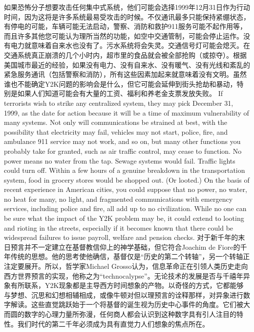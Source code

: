 \begin{paracol}{2}
\switchcolumn*
如果恐怖分子想要攻击任何集中式系统，他们可能会选择1999年12月31日作为行动时间，因为这将是许多系统最易受攻击的时候。不仅通讯最多只能保持紧绷状态，有停电的可能，车辆可能无法启动，警察、消防和救护911服务可能不起作用等，而且许多其他您可能认为理所当然的功能，如空中交通管制，可能会停止运作。没有电力就意味着自来水也没有了。污水系统将会失灵。交通信号灯可能会熄灭。在交通系统真正崩溃的几个小时内，超市里的食品就会被全部抢购（或掠夺）。根据美国城市最近的经验，如果没有电力、没有自来水、没有暖气、没有光线和紊乱的紧急服务通讯（包括警察和消防），所有这些因素加起来就意味着没有文明。虽然谁也不能确定Y2K问题的影响会是什么，但它可能会延伸到街头抢劫和暴动，特别是如果人们知道可能会有大量的工资、福利和养老金支票发放失败。
\switchcolumn
If terrorists wish to strike any centralized system, they may pick December 31, 1999, as the date for action because it will be a time of maximum vulnerability of many systems. Not only will communications be strained at best, with the possibility that electricity may fail, vehicles may not start, police, fire, and ambulance 911 service may not work, and so on, but many other functions you probably take for granted, such as air traffic control, may cease to function. No power means no water from the tap. Sewage systems would fail. Traffic lights could turn off. Within a few hours of a genuine breakdown in the transportation system, food in grocery stores would be shopped out. (Or looted.) On the basis of recent experience in American cities, you could suppose that no power, no water, no heat for many, no light, and fragmented communications with emergency services, including police and fire, all add up to no civilization. While no one can be sure what the impact of the Y2K problem may be, it could extend to looting and rioting in the streets, especially if it becomes known that there could be widespread failures to issue payroll, welfare and pension checks.
\switchcolumn*
对于新千年的末日预言并不一定建立在基督教信仰上的神学基础，但它符合Joachim de Fiore的千年传统的思想。他的思考使他确信，基督仅是“历史的第二个转轴”，另一个转轴正注定要展开。所以，哲学家Michael Grosso认为，信息革命正在引领人类历史走向西方世界预言的实现，他称之为“technocalypse”。无论技术的发展是否与千禧年异象有所联系，Y2K现象都是主导西方时间想象的产物。以奇怪的方式，它都能够与梦想、沉思和幻想相辅相成，或像牛顿对但以理预言的诠释那样，对异象进行数字解读。这些直觉跳跃始于一个将基督的诞生视为历史中心事件的角度。它们被大而圆的数字的心理力量所弥漫，任何商人都会认识到这种数字具有引人注目的特性。我们时代的第二千年必须成为具有直觉力人们想象的焦点所在。
\switchcolumn

\end{paracol}
